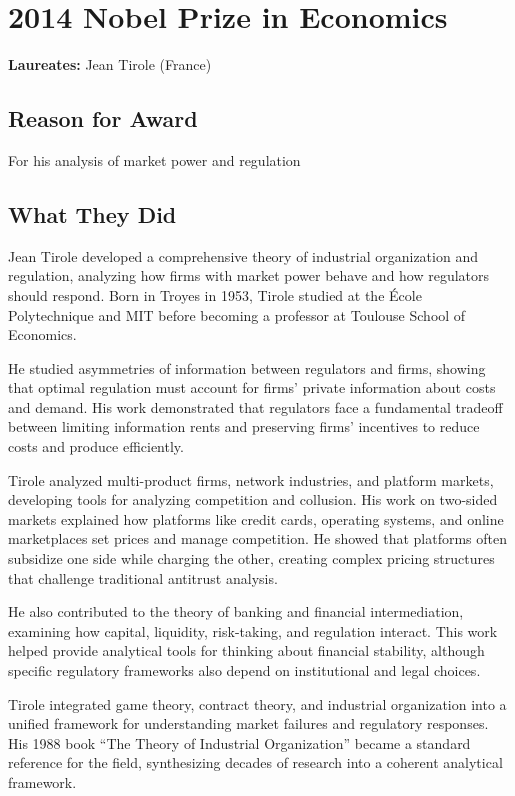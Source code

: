 \chapter{2014 Nobel Prize in Economics}
\textbf{Laureates: }Jean Tirole (France)

\section*{Reason for Award}
For his analysis of market power and regulation

\section{What They Did}
Jean Tirole developed a comprehensive theory of industrial organization and
regulation, analyzing how firms with market power behave and how regulators
should respond. Born in Troyes in 1953, Tirole studied at the École Polytechnique
and MIT before becoming a professor at Toulouse School of Economics.

He studied asymmetries of information between regulators and firms, showing
that optimal regulation must account for firms' private information about costs
and demand. His work demonstrated that regulators face a fundamental tradeoff
between limiting information rents and preserving firms' incentives to reduce
costs and produce efficiently.

Tirole analyzed multi-product firms, network industries, and platform markets,
developing tools for analyzing competition and collusion. His work on two-sided
markets explained how platforms like credit cards, operating systems, and online
marketplaces set prices and manage competition. He showed that platforms often
subsidize one side while charging the other, creating complex pricing structures
that challenge traditional antitrust analysis.

He also contributed to the theory of banking and financial intermediation,
examining how capital, liquidity, risk-taking, and regulation interact. This work
helped provide analytical tools for thinking about financial stability, although
specific regulatory frameworks also depend on institutional and legal choices.

Tirole integrated game theory, contract theory, and industrial organization into
a unified framework for understanding market failures and regulatory responses.
His 1988 book ``The Theory of Industrial Organization'' became a standard
reference for the field, synthesizing decades of research into a coherent
analytical framework.

